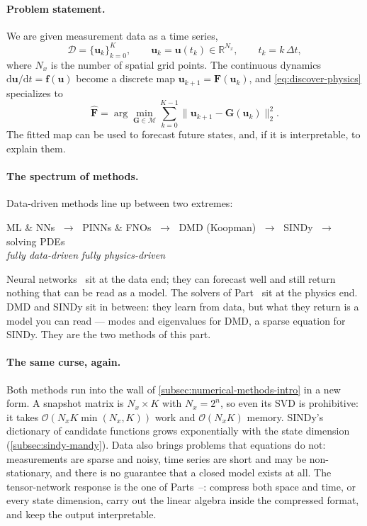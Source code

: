 \paragraph{Problem statement.}
We are given measurement data as a time series,
\begin{equation}
  \mathcal D = \{\mathbf u_k\}_{k=0}^{K}, \qquad
  \mathbf u_k = \mathbf u(t_k) \in \mathbb R^{N_x}, \qquad
  t_k = k\,\Delta t ,
  \label{eq:time-series}
\end{equation}%
where $N_x$ is the number of spatial grid points. The continuous dynamics
$\mathrm d\mathbf u/\mathrm dt = \mathbf f(\mathbf u)$ become a discrete map
$\mathbf u_{k+1} = \mathbf F(\mathbf u_k)$, and \eqref{eq:discover-physics}
specializes to
\begin{equation}
  \hat{\mathbf F} = \arg\min_{\mathbf G\in\mathcal M}
  \sum_{k=0}^{K-1} \bigl\lVert \mathbf u_{k+1} - \mathbf G(\mathbf u_k)\bigr\rVert_2^2 .
  \label{eq:inverse-ls}
\end{equation}%
The fitted map can be used to forecast future states, and, if it is
interpretable, to explain them.

\paragraph{The spectrum of methods.}
Data-driven methods line up between two extremes:
\begin{center}
  \small
  ML \& NNs $\;\to\;$ PINNs \& FNOs $\;\to\;$ DMD (Koopman)
  $\;\to\;$ SINDy $\;\to\;$ solving PDEs \\[2pt]
  \emph{fully data-driven} \hfill \emph{fully physics-driven}
\end{center}
Neural networks~\cite{Raissi2019,Lu2021,Li2021} sit at the data end; they can
forecast well and still return nothing that can be read as a model. The solvers
of Part~ sit at the physics end. DMD and SINDy sit in between: they
learn from data, but what they return is a model you can read --- modes and
eigenvalues for DMD, a sparse equation for SINDy. They are the two methods of
this part.

\paragraph{The same curse, again.}
Both methods run into the wall of \cref{subsec:numerical-methods-intro} in a new
form. A snapshot matrix is $N_x \times K$ with $N_x = 2^n$, so even its SVD is
prohibitive: it takes $\mathcal O(N_x K \min(N_x,K))$ work and
$\mathcal O(N_x K)$ memory. SINDy's dictionary of candidate functions grows
exponentially with the state dimension (\cref{subsec:sindy-mandy}). Data also
brings problems that equations do not: measurements are sparse and noisy, time
series are short and may be non-stationary, and there is no guarantee that a
closed model exists at all. The tensor-network response is the one of
Parts~--: compress both space and time, or every state
dimension, carry out the linear algebra inside the compressed format, and keep
the output interpretable.

